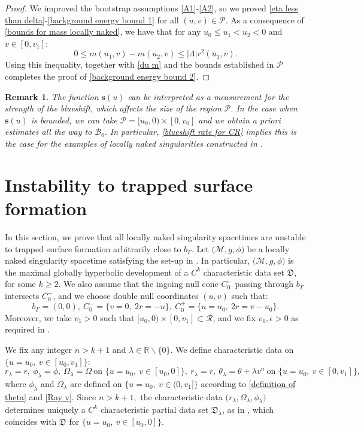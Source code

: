 \documentclass[11pt]{article}
\newtheorem{remark}{Remark}[section]
\numberwithin{equation}{section}
\begin{document}
\begin{proof}
We improved the bootstrap assumptions \eqref{A1}-\eqref{A2}, so we proved \eqref{eta less than delta}-\eqref{background energy bound 1} for all $(u,v)\in\mathcal{P}.$ As a consequence of \eqref{bounds for mass locally naked}, we have that for any $u_0\leq u_1<u_2<0$ and $v\in[0,v_1]:$
\[0\leq m(u_1,v)-m(u_2,v)\leq|\Lambda|r^2(u_1,v).\]
Using this inequality, together with \eqref{du m} and the bounds established in $\mathcal{P}$ completes the proof of \eqref{background energy bound 2}.
\end{proof}

\begin{remark}
    The function $\mathbf{s}(u)$ can be interpreted as a measurement for the strength of the blueshift, which affects the size of the region $\mathcal{P}.$ In the case when $\mathbf{s}(u)$ is bounded, we can take $\mathcal{P}=[u_0,0)\times[0,v_0]$ and we obtain a priori estimates all the way to $\mathcal{B}_0.$ In particular, \eqref{blueshift rate for CR} implies this is the case for the examples of locally naked singularities constructed in \cite{preparation}.
\end{remark}


\section{Instability to trapped surface formation}\label{instability section}
In this section, we prove that all locally naked singularity spacetimes are unstable to trapped surface formation arbitrarily close to $b_{\Gamma}$. Let $\big(\mathcal{M},g,\phi\big)$ be a locally naked singularity spacetime satisfying the set-up in . In particular, $\big(\mathcal{M},g,\phi\big)$ is the maximal globally hyperbolic development of a $C^k$ characteristic data set $\mathfrak{D}$, for some $k\geq 2$. We also assume that the ingoing null cone $C_0^-$ passing through $b_{\Gamma}$ intersects $C_0^+$, and we choose double null coordinates $(u,v)$ such that: \[b_{\Gamma}=(0,0),\ C_0^-=\big\{v=0,\ 2r=-u\big\},\ C_0^+=\big\{u=u_0,\ 2r=v-u_0\big\}.\]
Moreover, we take $v_1>0$ such that $[u_0,0)\times[0,v_1]\subset\mathcal{R}$, and we fix $v_0,\epsilon>0$ as required in .

We fix any integer $n>k+1$ and $\lambda\in\mathbb{R}\backslash\{0\}$. We define characteristic data on $\big\{u=u_0,\ v\in[u_0,v_1]\big\}:$
\begin{equation}\label{characteristic data perturbation}
    r_{\lambda}=r,\ \phi_{\lambda}=\phi,\ \Omega_{\lambda}=\Omega\ \text{on }\big\{u=u_0,\ v\in[u_0,0]\big\},\ r_{\lambda}=r,\ \theta_{\lambda}=\theta+\lambda v^{n}\ \text{on }\big\{u=u_0,\ v\in[0,v_1]\big\},
\end{equation}
where $\phi_{\lambda}$ and $\Omega_{\lambda}$ are defined on $\big\{u=u_0,\ v\in(0,v_1]\big\}$ according to \eqref{definition of theta} and \eqref{Ray v}. Since $n>k+1,$ the characteristic data $\big(r_{\lambda},\Omega_{\lambda},\phi_{\lambda}\big)$ determines uniquely a $C^k$ characteristic partial data set $\mathfrak{D}_{\lambda}$, as in , which coincides with $\mathfrak{D}$ for $\big\{u=u_0,\ v\in[u_0,0]\big\}.$ 
\end{document}
